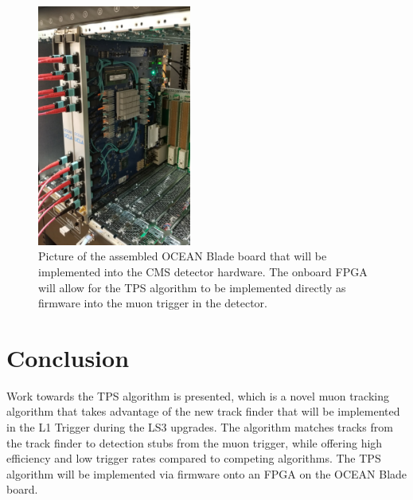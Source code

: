 \begin{figure}[htbp] %
  \centering
  \includegraphics[width=0.45\textwidth]{fig/TPS/ocean.pdf}
  \caption{
    Picture of the assembled OCEAN Blade board that will be implemented into the CMS detector hardware.
    The onboard FPGA will allow for the TPS algorithm to be implemented directly as firmware into the muon trigger in the detector.
  }
  \label{fig:ocean}
\end{figure}

\section{Conclusion}

Work towards the TPS algorithm is presented, which is a novel muon tracking algorithm that takes advantage of the new track finder that will be implemented in the L1 Trigger during the LS3 upgrades.
The algorithm matches tracks from the track finder to detection stubs from the muon trigger, while offering high efficiency and low trigger rates compared to competing algorithms.
The TPS algorithm will be implemented via firmware onto an FPGA on the OCEAN Blade board.
